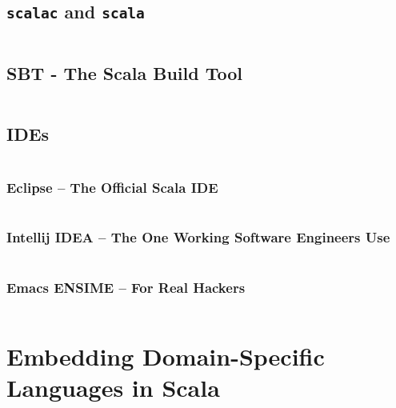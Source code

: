 \subsection{{\tt scalac} and {\tt scala} }

\begin{lstlisting}[language=Scala]
\end{lstlisting}

\subsection{SBT - The Scala Build Tool}

\begin{lstlisting}[language=Scala]
\end{lstlisting}

\subsection{IDEs}

\begin{lstlisting}[language=Scala]
\end{lstlisting}

\subsubsection{Eclipse -- The Official Scala IDE}

\begin{lstlisting}[language=Scala]
\end{lstlisting}

\subsubsection{Intellij IDEA -- The One Working Software Engineers Use}

\begin{lstlisting}[language=Scala]
\end{lstlisting}

\subsubsection{Emacs ENSIME -- For Real Hackers}

\begin{lstlisting}[language=Scala]
\end{lstlisting}

\section{Embedding Domain-Specific Languages in Scala}

